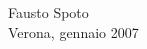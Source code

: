 {\flushright Fausto Spoto\\\hfill Verona, gennaio 2007}


\newpage
\tableofcontents
\cleardoublepage

 \setcounter{page}{1}

